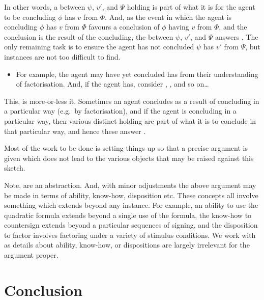 \begin{note}
  In other words, a \ros{} between \(\psi\), \(v'\), and \(\Psi\) holding is part of what it is for the agent to be concluding \(\phi\) has  \(v\) from \(\Phi\).
  And, as the event in which the agent is concluding \(\phi\) has  \(v\) from \(\Phi\) favours a conclusion of \(\phi\) having  \(v\) from \(\Phi\), and the conclusion is the result of the concluding, the \ros{} between \(\psi\), \(v'\), and \(\Psi\) answers \qWhy{}.
  The only remaining task is to ensure the agent has not concluded \(\psi\) has  \(v'\) from \(\Psi\), but instances are not too difficult to find.
  \begin{itemize}
  \item
    For example, the agent may have yet concluded \propI{\rootsSimp{}} has   from their understanding of factorisation.
    And, if the agent has, consider \propI{\rootsSimpX{}}, \propI{\rootsSimpY{}}, and so on\dots
  \end{itemize}
  This, is more-or-less it.
  Sometimes an agent concludes as a result of concluding in a particular way (e.g.\ by factorisation), and if the agent is concluding in a particular way, then various distinct  holding are part of what it is to conclude in that particular way, and hence these answer \qWhy{}.

  Most of the work to be done is setting things up so that a precise argument is given which does not lead to the various objects that may be raised against this sketch.
\end{note}


\begin{note}
  Note,  are an abstraction.
  And, with minor adjustments the above argument may be made in terms of ability, know-how, disposition etc.
  These concepts all involve something which extends beyond any instance.
  For example, an ability to use the quadratic formula extends beyond a single use of the formula, the know-how to countersign extends beyond a particular sequences of signing, and the disposition to factor involves factoring under a variety of stimulus conditions.
  We work with  as details about ability, know-how, or dispositions are largely irrelevant for the argument proper.
\end{note}

\section*{Conclusion}
\label{sec:conclusion}


